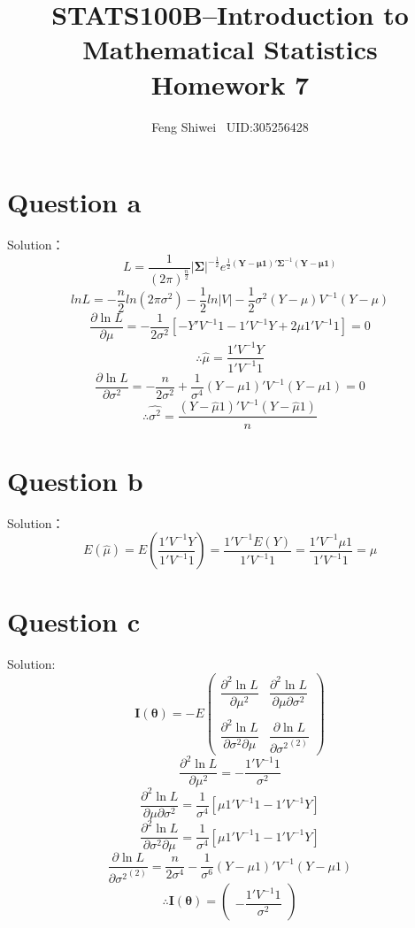 \documentclass[a4papers]{ctexart}
\title{STATS100B--Introduction to Mathematical Statistics \\Homework 7}
\author{Feng Shiwei \ UID:305256428}
\date{}
\begin{document}
\maketitle
\section*{Question a}
\noindent Solution：\\
\indent 
\[L=\dfrac{1}{(2\pi)^{\frac{n}{2}}}|\boldsymbol{\Sigma}|^{-\frac{1}{2}} 
    e^{\frac{1}{2}(\boldsymbol{Y}-\boldsymbol{\mu1})'\boldsymbol{\Sigma}^{-1}(\boldsymbol{Y}-\boldsymbol{\mu1}) }
\]
\[lnL = -\dfrac{n}{2}ln(2\pi\sigma^2)-\dfrac{1}{2}ln|V|-\dfrac{1}2\sigma^2(Y-\mu)V^{-1}(Y-\mu)
 \]
 \[\dfrac {\partial \ln L}{\partial \mu }=-\dfrac {1}{2\sigma ^{2}}\left[ -Y'V^{-1}1-1'V^{-1}Y+2\mu 1'V^{-1}1\right] =0
     \]
\[ \therefore \hat{\mu} = \dfrac{1'V^{-1}Y}{1'V^{-1}1}\]
\[ \dfrac {\partial \ln L}{\partial \sigma ^{2}}=-\dfrac {n}{2\sigma ^{2}}+\dfrac {1}{\sigma ^{4}}\left( Y-\mu 1\right) 'V^{-1}\left( Y-\mu 1\right) =0\]
\[\therefore \hat{\sigma^2} =\dfrac{\left( Y-\hat{\mu} 1\right) 'V^{-1}\left( Y-\hat{\mu} 1\right)}{n} \]


\section*{Question b}
\noindent  Solution：
\[E(\hat{\mu}) = E\left(\dfrac{1'V^{-1}Y}{1'V^{-1}1}\right) = \dfrac{1'V^{-1}E(Y)}{1'V^{-1}1} =\dfrac{1'V^{-1}\mu1}{1'V^{-1}1} =\mu\]
\[  \]



\section*{Question c}
\noindent Solution:
\[ \boldsymbol{I}(\boldsymbol{\theta}) = -E \begin{pmatrix}
    \dfrac {\partial ^{2}\ln L}{\partial \mu^2} 
    & \dfrac {\partial^{2}\ln L}{\partial \mu \partial \sigma ^{2}} \\ \\
    \dfrac {\partial ^{2}\ln L}{\partial \sigma ^{2}\partial \mu } 
    & \dfrac {\partial \ln L}{\partial {\sigma ^{2}}^{(2)} }
\end{pmatrix}\]
\[  \dfrac {\partial ^{2}\ln L}{\partial \mu^2 }=-\dfrac {1'V^{-1}1}{\sigma ^{2}} \]
\[ \dfrac {\partial^{2}\ln L}{\partial \mu \partial \sigma ^{2}}=\dfrac {1}{\sigma ^{4}}\left[ \mu 1'V^{-1}1-1'V^{-1}Y\right] \]
\[ \dfrac {\partial ^{2}\ln L}{\partial \sigma ^{2}\partial \mu } = \dfrac {1}{\sigma ^{4}}\left[ \mu 1'V^{-1}1-1'V^{-1}Y\right] \]
\[ \dfrac {\partial \ln L}{\partial {\sigma ^{2}}^{(2)} } =\dfrac {n}{2\sigma ^{4}}-\dfrac {1}{\sigma ^{6}}\left( Y-\mu 1\right) 'V^{-1}\left( Y-\mu 1\right)  \]
\[ \therefore \boldsymbol{I}(\boldsymbol{\theta}) =\begin{pmatrix}
    -\dfrac {1'V^{-1}1}{\sigma ^{2}}
\end{pmatrix}  \]
\end{document}
